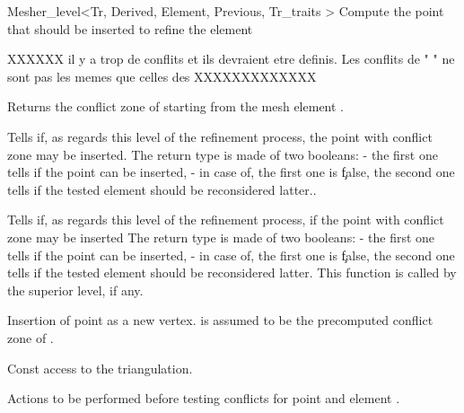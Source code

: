 \begin{ccRefClass}{Mesher_level<Tr, Derived, Element, Previous,
Tr_traits >}
{Compute the point that should be inserted to refine the element }

XXXXXX  il y a trop de conflits et ils devraient etre definis.
Les conflits de "  " ne sont pas les memes que celles des
 XXXXXXXXXXXXX


	{Returns the conflict zone of  starting from the
	mesh element .
       }

{ Tells if, as regards this level of the refinement process, the
  point  with conflict zone  may be inserted.
  The return   type is made of two booleans:
        - the first one tells if the point can be inserted,
        - in case of, the first one is \c false, the second one tells if
        the tested element should be reconsidered latter..}
 

{ Tells if, as regards this level of the refinement process, if the
      point   with conflict zone  may be inserted
The return   type is made of two booleans:
        - the first one tells if the point can be inserted,
        - in case of, the first one is \c false, the second one tells if
        the tested element should be reconsidered latter.
      This function is called by the superior level, if any.}


        { Insertion of point  as a new vertex.
	 is assumed to be the precomputed conflict zone of
	.}	
	

 






\ccGlue
{}
         {Const access to the triangulation.}

{Actions to be performed before testing conflicts 
for point  and element .}



\end{ccRefClass}
